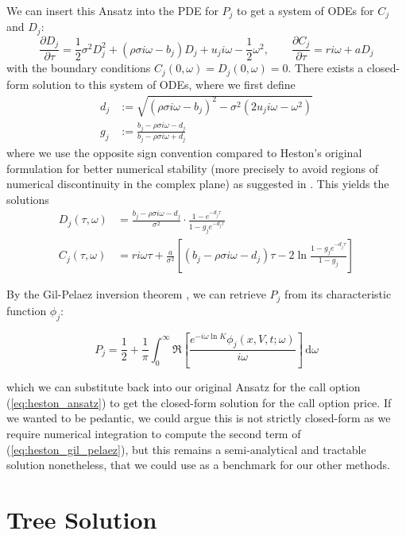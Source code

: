 We can insert this Ansatz into the PDE for $P_j$ to get a system of ODEs for $C_j$ and $D_j$:
\begin{equation}
    \frac{\partial D_j}{\partial \tau} = \frac 12 \sigma^2 D_j^2 + (\rho \sigma i \omega - b_j)D_j + u_j i \omega - \frac 12 \omega^2, \qquad \frac{\partial C_j}{\partial \tau } = ri\omega + aD_j
\end{equation}
with the boundary conditions $C_j(0, \omega) = D_j(0, \omega) = 0$. There exists a closed-form solution to this system of ODEs, where we first define
\begin{align}
    d_j & := \sqrt{(\rho \sigma i \omega - b_j)^2 - \sigma^2 (2u_j i\omega - \omega^2)} \\
    g_j & := \frac{b_j - \rho \sigma i \omega - d_j}{b_j - \rho \sigma i \omega + d_j}
\end{align}
where we use the opposite sign convention compared to Heston's original formulation for better numerical stability (more precisely to avoid regions of numerical discontinuity in the complex plane) as suggested in \cite{albrecher2007little}. This yields the solutions
\begin{align}
    D_j(\tau, \omega) &= \frac{b_j - \rho\sigma i\omega - d_j}{\sigma^2} \cdot \frac{1 - e^{-d_j\tau}}{1 - g_j e^{-d_j\tau}} \\
    C_j(\tau, \omega) &= ri\omega\tau + \frac a{\sigma^2} \left[(b_j - \rho \sigma i \omega - d_j)\tau - 2\ln \frac{1-g_j e^{-d_j\tau}}{1 -g_j}\right]
\end{align}

By the Gil-Pelaez inversion theorem \cite{gil1951note}, we can retrieve $P_j$ from its characteristic function $\phi_j$:

\begin{equation}
P_j = \frac 12 + \frac 1\pi \int_0^\infty \Re\left[\frac{e^{-i\omega \ln K} \phi_j(x, V, t; \omega)}{i\omega}\right]\,\mathrm d\omega
\label{eq:heston_gil_pelaez}
\end{equation}

which we can substitute back into our original Ansatz for the call option (\ref{eq:heston_ansatz}) to get the closed-form solution for the call option price. If we wanted to be pedantic, we could argue this is not strictly closed-form as we require numerical integration to compute the second term of (\ref{eq:heston_gil_pelaez}), but this remains a semi-analytical and tractable solution nonetheless, that we could use as a benchmark for our other methods.

\section{Tree Solution}

